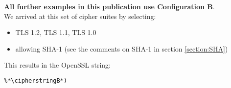 \textbf{All further examples in this publication use Configuration B}.\\

We arrived at this set of cipher suites by selecting:

\begin{itemize}
\item TLS 1.2, TLS 1.1, TLS 1.0
\item allowing SHA-1 (see the comments on SHA-1 in section \ref{section:SHA})

\end{itemize}

This results in the OpenSSL string:

\begin{lstlisting}
%*\cipherstringB*)
\end{lstlisting}

